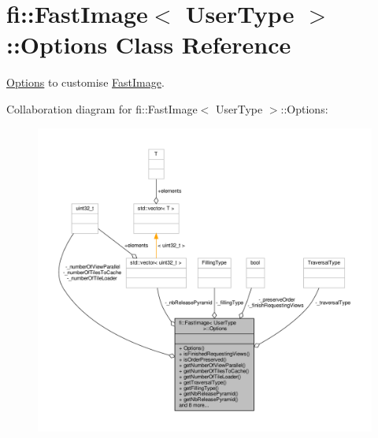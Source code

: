 \hypertarget{classfi_1_1FastImage_1_1Options}{}\section{fi\+:\+:Fast\+Image$<$ User\+Type $>$\+:\+:Options Class Reference}
\label{classfi_1_1FastImage_1_1Options}


\hyperlink{classfi_1_1FastImage_1_1Options}{Options} to customise \hyperlink{classfi_1_1FastImage}{Fast\+Image}.  




Collaboration diagram for fi\+:\+:Fast\+Image$<$ User\+Type $>$\+:\+:Options\+:
\nopagebreak
\begin{figure}[H]
\begin{center}
\leavevmode
\includegraphics[width=350pt]{dd/ddc/classfi_1_1FastImage_1_1Options__coll__graph}
\end{center}
\end{figure}
